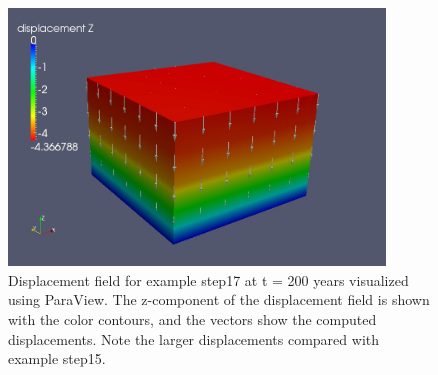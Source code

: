 \begin{figure}
  \includegraphics[width=10cm]{examples/figs/3dhex8_step17-displ-t200}
  \caption{Displacement field for example step17 at t = 200 years visualized
    using ParaView. The z-component of the displacement field is shown
    with the color contours, and the vectors show the computed displacements.
    Note the larger displacements compared with example step15.}
  \label{fig:example:3dhex8:step17:displacement}
\end{figure}

